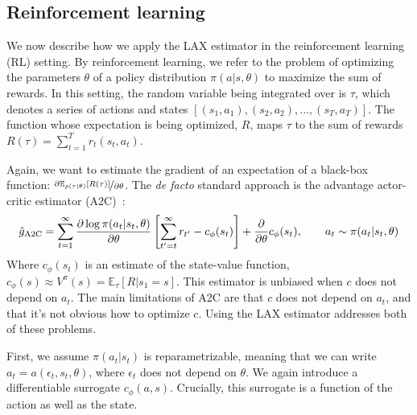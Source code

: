 \documentclass{article}
\newcommand{\E}{\mathbb{E}}
\newcommand{\LL}[1]{\frac{\partial \log \pi(a_{#1}| s_{#1}, \theta)}{\partial \theta}}
\newcommand{\LAX}{{\textnormal{LAX}}}
\begin{document}
\subsection{Reinforcement learning}
We now describe how we apply the \LAX{} estimator in the reinforcement learning (RL) setting.
By reinforcement learning, we refer to the problem of optimizing the parameters $\theta$ of a policy distribution $\pi(a | s, \theta)$ to maximize the sum of rewards.
In this setting, the random variable being integrated over is $\tau$, which denotes a series of actions and states $[(s_1, a_1), (s_2, a_2), ..., (s_T, a_T)]$.
The function whose expectation is being optimized, $R$, maps $\tau$ to the sum of rewards ${R(\tau) = \sum_{t=1}^{T} r_t(s_t, a_t)}$.

Again, we want to estimate the gradient of an expectation of a black-box function: $\nicefrac{\partial \mathbb{E}_{p(\tau|\theta)}[R(\tau)]}{\partial \theta}$.
The \emph{de facto} standard approach is the advantage actor-critic estimator (A2C)~\citep{sutton2000policy}:%
%
%
%
%
%
%
\begin{align}
\hat g_{\textnormal{A2C}} = \sum_{t=1}^{\infty} \LL{t} \left[ \sum_{t'=t}^{\infty} r_{t'} - c_\phi(s_t) \right]+\frac{\partial}{\partial\theta} c_\phi(s_t), \qquad a_t \sim \pi(a_t | s_t, \theta)
\label{eq:rl_a2c}
\end{align}
%
Where $c_\phi(s_t)$ is an estimate of the state-value function, $c_\phi(s) \approx V^\pi(s) = \E_{\tau}[R|s_1=s].$
This estimator is unbiased when $c$ does not depend on $a_t$.
The main limitations of A2C are that $c$ does not depend on $a_t$, and that it's not obvious how to optimize $c$.
Using the \LAX{} estimator addresses both of these problems.

First, we assume $\pi(a_t|s_t)$ is reparametrizable, meaning that we can write $a_t = a(\epsilon_t, s_t, \theta)$, where $\epsilon_t$ does not depend on $\theta$.
We again introduce a differentiable surrogate $c_\phi(a,s)$.
Crucially, this surrogate is a function of the action as well as the state.
\end{document}
